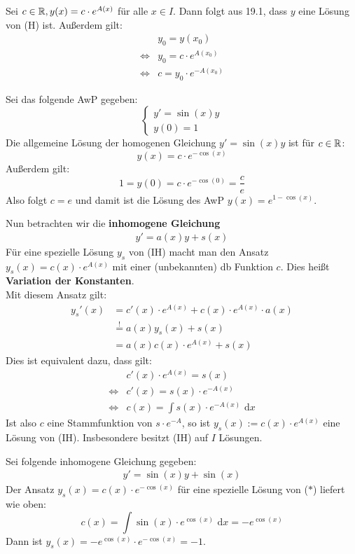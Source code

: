 \documentclass[a4paper,twoside,DIV15,BCOR12mm,chapterprefix=true,headings=twolinechapter]{scrbook}
\begin{document}
\begin{beweis}
Sei $c\in\mathbb{R},y(x)=c\cdot e^{A(x)}$ für alle $x\in I$. Dann folgt aus 19.1, dass
$y$ eine Lösung von (H) ist. Außerdem gilt:
\begin{align*}
&y_0=y(x_0)\\
\iff &y_0=c\cdot e^{A(x_0)}\\
\iff &c=y_0\cdot e^{-A(x_0)}
\end{align*}
\end{beweis}

\begin{beispiel}
Sei das folgende AwP gegeben:
\[\begin{cases}
y'=\sin(x)y\\
y(0)=1
\end{cases}\]
Die allgemeine Lösung der homogenen Gleichung $y'=\sin(x)y$ ist für $c\in\mathbb{R}$:
\[y(x)=c\cdot e^{-\cos(x)}\]
Außerdem gilt:
\[1=y(0)=c\cdot e^{-\cos(0)}=\frac ce\]
Also folgt $c=e$ und damit ist die Lösung des AwP $y(x)=e^{1-\cos(x)}$.
\end{beispiel}

Nun betrachten wir die \textbf{inhomogene Gleichung}
\begin{align*}
y'=a(x)y+s(x)\tag{IH}
\end{align*}
Für eine spezielle Lösung $y_s$ von (IH) macht man den Ansatz $y_s(x)=c(x)\cdot e^{A(x)}$ 
mit einer (unbekannten) db Funktion $c$. Dies heißt \textbf{Variation der Konstanten}.\\
Mit diesem Ansatz gilt:
\begin{align*}
y_s'(x)&=c'(x)\cdot e^{A(x)}+c(x)\cdot e^{A(x)}\cdot a(x)\\
&\stackrel{!}{=}a(x)y_s(x)+s(x)\\
&=a(x)c(x)\cdot e^{A(x)}+s(x)
\end{align*}
Dies ist equivalent dazu, dass gilt:
\begin{align*}
&c'(x)\cdot e^{A(x)}=s(x)\\
\iff &c'(x)=s(x)\cdot e^{-A(x)}\\
\iff &c(x)=\int s(x)\cdot e^{-A(x)}\text{ d}x
\end{align*}
Ist also $c$ eine Stammfunktion von $s\cdot e^{-A}$, so ist $y_s(x):=c(x)\cdot e^{A(x)}$
eine Lösung von (IH). Insbesondere besitzt (IH) auf $I$ Lösungen.

\begin{beispiel}
Sei folgende inhomogene Gleichung gegeben:
\begin{align*}
y'=\sin(x)y+\sin(x)\tag{$*$}
\end{align*}
Der Ansatz $y_s(x)=c(x)\cdot e^{-\cos(x)}$ für eine spezielle Lösung von ($*$) liefert wie oben:
\[c(x)=\int \sin(x)\cdot e^{\cos(x)}\text{ d}x = -e^{\cos(x)}\]
Dann ist $y_s(x)=-e^{\cos(x)}\cdot e^{-\cos(x)}=-1$.
\end{beispiel}
\end{document}
